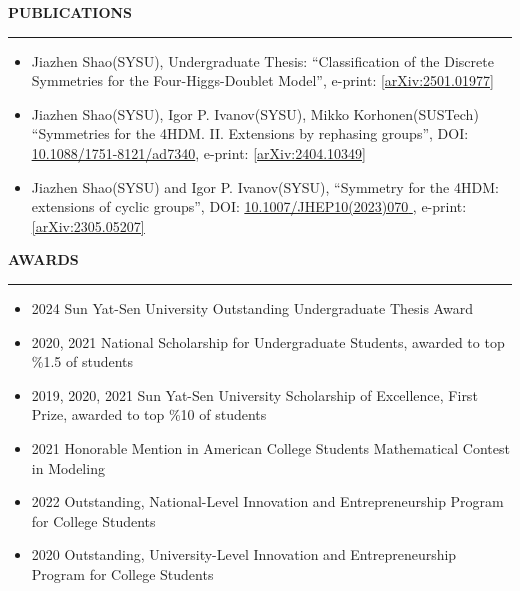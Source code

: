 \documentclass[11pt,letterpaper]{article}
\newcommand{\blue}{\color{blue}}
\begin{document}
\textbf{\MakeUppercase{Publications}}
\vspace{0.5em}
\hrule
\vspace{-0.3em}
\begin{itemize}
    \itemsep -5pt {}
    \item {Jiazhen Shao}(SYSU), Undergraduate Thesis: ``Classification of the Discrete Symmetries for the Four-Higgs-Doublet Model'', e-print: \href{https://arxiv.org/abs/2501.01977}{\blue \underline{[arXiv:2501.01977]}}

    \item  {{Jiazhen Shao}(SYSU)}, {{Igor P. Ivanov}(SYSU)}, {{Mikko Korhonen}(SUSTech)} ``Symmetries for the 4HDM. II. Extensions by rephasing groups'', DOI: \href{https://doi.org/10.1088/1751-8121/ad7340}{\blue \underline{10.1088/1751-8121/ad7340}}, e-print: \href{https://arxiv.org/abs/2404.10349}{\blue \underline{[arXiv:2404.10349]}}

    \item   { {Jiazhen Shao}(SYSU)} and { {Igor P. Ivanov}(SYSU)}, ``Symmetry for the 4HDM: extensions of cyclic groups'', DOI: \href{https://link.springer.com/article/10.1007/JHEP10(2023)070}{\blue \underline{{10.1007/JHEP10(2023)070}} }, e-print: \href{https://arxiv.org/abs/2305.05207v1}{ \blue \underline{[arXiv:2305.05207]}}
    
    
\end{itemize}

\vspace{1.6em}

\textbf{\MakeUppercase{Awards}}
\vspace{0.5em}
\hrule
\vspace{-0.3em}
\begin{itemize}
    \itemsep -5pt {} 
    \item 2024 \hspace{5.9em} Sun Yat-Sen University Outstanding Undergraduate Thesis Award
    \item 2020, 2021  \hspace{3.1em} National Scholarship for Undergraduate Students, awarded to top \%1.5 of students
    \item 2019, 2020, 2021 \hspace{0.3em} Sun Yat-Sen University Scholarship of Excellence, First Prize, awarded to top \%10 of students
    \item 2021  \hspace{5.8em}  Honorable Mention in American College Students Mathematical Contest in Modeling
    \item 2022 \hspace{5.75em} Outstanding, National-Level Innovation and Entrepreneurship Program for College Students 
    \item 2020 \hspace{5.8em} Outstanding, University-Level Innovation and Entrepreneurship Program for College Students 
\end{itemize}
\end{document}
